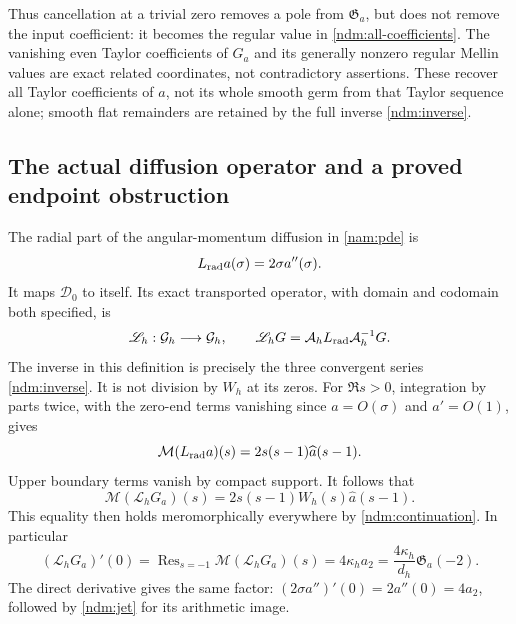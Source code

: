 Thus cancellation at a trivial zero removes a pole from
\(\mathfrak G_a\), but does not remove the input coefficient:
it becomes the regular value in \eqref{ndm:all-coefficients}.
The vanishing even Taylor coefficients of \(G_a\) and its generally
nonzero regular Mellin values are exact related coordinates, not
contradictory assertions. These recover all Taylor coefficients of
\(a\), not its whole smooth germ from that Taylor sequence alone;
smooth flat remainders are retained by the full inverse
\eqref{ndm:inverse}.

\subsection{The actual diffusion operator and a proved endpoint obstruction}

The radial part of the angular-momentum diffusion in
\eqref{nam:pde} is
\[
 L_{\rm rad}a(\sigma)=2\sigma a''(\sigma).
\]
It maps \(\mathcal D_0\) to itself. Its exact transported operator,
with domain and codomain both specified, is
\begin{equation}\label{ndm:transport}
 \mathscr L_h:\mathcal G_h\longrightarrow\mathcal G_h,\qquad
 \mathscr L_hG=\mathcal A_hL_{\rm rad}\mathcal A_h^{-1}G.
\end{equation}
The inverse in this definition is precisely the three convergent
series \eqref{ndm:inverse}. It is not division by \(W_h\) at its zeros.
For \(\Re s>0\), integration by parts twice, with the zero-end
terms vanishing since \(a=O(\sigma)\) and \(a'=O(1)\), gives
\[
 \mathcal M(L_{\rm rad}a)(s)=2s(s-1)\widehat a(s-1).
\]
Upper boundary terms vanish by compact support. It follows that
\begin{equation}\label{ndm:radial-mellin}
 \mathcal M(\mathscr L_hG_a)(s)
       =2s(s-1)W_h(s)\widehat a(s-1).
\end{equation}
This equality then holds meromorphically everywhere by
\eqref{ndm:continuation}. In particular
\begin{equation}\label{ndm:radial-residue}
 \boxed{\quad
 (\mathscr L_hG_a)'(0)
 =\operatorname{Res}_{s=-1}\mathcal M(\mathscr L_hG_a)(s)
 =4\kappa_h a_2
 =\frac{4\kappa_h}{d_h}\mathfrak G_a(-2).\quad}
\end{equation}
The direct derivative gives the same factor:
\((2\sigma a'')'(0)=2a''(0)=4a_2\), followed by
\eqref{ndm:jet} for its arithmetic image.

